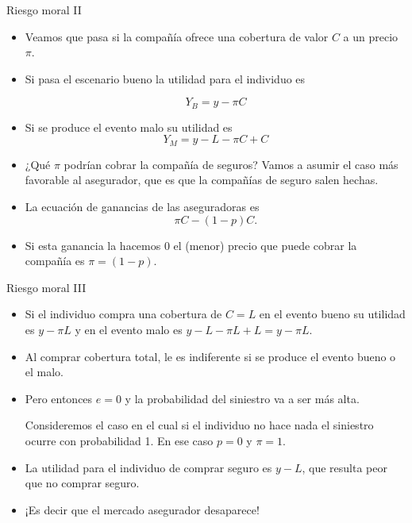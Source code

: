 \documentclass{beamer}
\begin{document}
\begin{frame}{Riesgo moral II}
\begin{itemize}
\item Veamos que pasa si la compañía ofrece una cobertura de valor $C$ a un precio $\pi$. 

\item Si pasa el escenario bueno la utilidad para el individuo es 

\begin{equation}
    Y_B = y - \pi C
\end{equation}

\item Si se produce el evento malo su utilidad es 
\begin{equation}
    Y_M = y - L - \pi C + C
\end{equation}

\item ¿Qué $\pi$ podrían cobrar la compañía de seguros? Vamos a asumir el caso más favorable al asegurador, que es que la compañías de seguro salen hechas. 

\item La ecuación de ganancias de las aseguradoras es  
\begin{equation}
    \pi C - (1-p) C.
    \end{equation}

\item Si esta ganancia la hacemos $0$ el (menor) precio que puede cobrar la compañía es $\pi=(1-p)$.
\end{itemize}
\end{frame}

\begin{frame}{Riesgo moral III}
\begin{itemize}
\item Si el individuo compra una cobertura de $C=L$ en el evento bueno su utilidad es $y-\pi L$ y en el evento malo es $y-L-\pi L+L=y-\pi L $. 

\item Al comprar cobertura total, le es indiferente si se produce el evento bueno o el malo. 

\item Pero entonces $e=0$ y la probabilidad del siniestro va a ser más alta. 

\itiem Consideremos el caso en el cual si el individuo no hace nada el siniestro ocurre con probabilidad 1. En ese caso $p=0$ y $\pi=1$. 

\item La utilidad para el individuo de comprar seguro es $y-L$, que resulta peor que no comprar seguro. 

\item ¡Es decir que el mercado asegurador desaparece! 

  \end{itemize}   
\end{frame}
\end{document}

